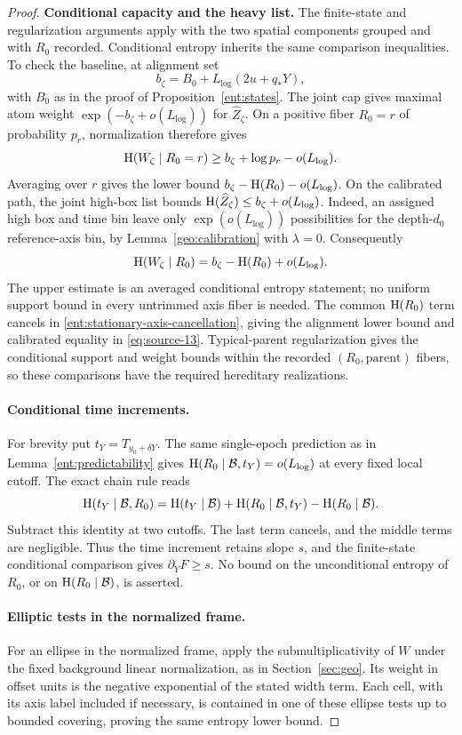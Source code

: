 \begin{proof}
\textbf{Conditional capacity and the heavy list.}
The finite-state and regularization arguments apply with the two
spatial components grouped and with $R_0$ recorded.  Conditional
entropy inherits the same comparison inequalities.  To check the
baseline, at alignment set
\[
b_\zeta=B_0+L_{\log}(2u+q_*Y),
\]
with $B_0$ as in the proof of Proposition~\ref{ent:states}.
The joint cap gives maximal atom weight
$\exp(-b_\zeta+o(L_{\log}))$ for $\widehat Z_\zeta$.
On a positive fiber $R_0=r$ of probability $p_r$, normalization
therefore gives
\[
\operatorname{H}(W_\zeta\mid R_0=r)
\ge b_\zeta+\log p_r-o(L_{\log}).
\]
Averaging over $r$ gives the lower bound
$b_\zeta-\operatorname{H}(R_0)-o(L_{\log})$.  On the calibrated path,
the joint high-box list bounds
$\operatorname{H}(\widehat Z_\zeta)\le b_\zeta+o(L_{\log})$.
Indeed, an assigned high box and time bin leave only
$\exp(o(L_{\log}))$ possibilities for the depth-$d_0$ reference-axis
bin, by Lemma~\ref{geo:calibration} with $\lambda=0$.
Consequently
\[
\operatorname{H}(W_\zeta\mid R_0)
=b_\zeta-\operatorname{H}(R_0)+o(L_{\log}).
\]
The upper estimate is an averaged conditional entropy statement;
no uniform support bound in every untrimmed axis fiber is needed.
The common $\operatorname{H}(R_0)$ term cancels in
\eqref{ent:stationary-axis-cancellation}, giving the alignment
lower bound and calibrated equality in \eqref{eq:source-13}.
Typical-parent regularization gives the conditional support and
weight bounds within the recorded $(R_0,\text{parent})$ fibers,
so these comparisons have the required hereditary realizations.

\paragraph{Conditional time increments.}
For brevity put $t_Y=T_{y_0+\delta Y}$.  The same single-epoch
prediction as in Lemma~\ref{ent:predictability} gives
$\operatorname{H}(R_0\mid\mathcal B,t_Y)=o(L_{\log})$ at every fixed
local cutoff.  The exact chain rule reads
\[
\operatorname{H}(t_Y\mid\mathcal B,R_0)
=\operatorname{H}(t_Y\mid\mathcal B)
 +\operatorname{H}(R_0\mid\mathcal B,t_Y)-\operatorname{H}(R_0\mid\mathcal B).
\]
Subtract this identity at two cutoffs.  The last term cancels,
and the middle terms are negligible.  Thus the time increment
retains slope $s$, and the finite-state conditional comparison
gives $\partial_YF\ge s$.  No bound on the unconditional entropy
of $R_0$, or on $\operatorname{H}(R_0\mid\mathcal B)$, is asserted.

\paragraph{Elliptic tests in the normalized frame.}
For an ellipse in the normalized frame, apply
the submultiplicativity of $W$ under the fixed background linear
normalization, as in Section~\ref{sec:geo}.  Its weight in offset
units is the negative exponential of the stated width term.  Each
cell, with its axis label included if necessary, is contained in
one of these ellipse tests up to bounded covering, proving the
same entropy lower bound.
\end{proof}

